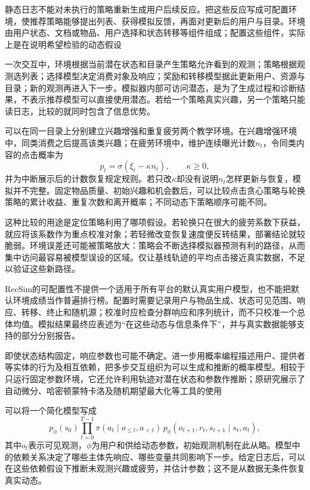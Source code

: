 静态日志不能对未执行的策略重新生成用户后续反应。把这些反应写成可配置环境，使推荐策略能够提出列表、获得模拟反馈，再面对更新后的用户与目录。环境由用户状态、文档或物品、用户选择和状态转移等组件组成；配置这些组件，实际上是在说明希望检验的动态假设

一次交互中，环境根据当前潜在状态和目录产生策略允许看到的观测；策略根据观测选列表；选择模型决定消费对象及响应；奖励和转移模型据此更新用户、资源与目录；新的观测再进入下一步。模拟器内部可访问潜态，是为了生成过程和诊断结果，不表示推荐模型可以直接使用潜态。若给一个策略真实兴趣，另一个策略只能读日志，比较的就同时包含了信息优势。

可以在同一目录上分别建立兴趣增强和重复疲劳两个教学环境。在兴趣增强环境中，同类消费之后提高该类兴趣；在疲劳环境中，维护连续曝光计数$n_t$，令同类内容的点击概率为
\[
 p_t=\sigma(\xi_t-\kappa n_t),
 \qquad \kappa\geq0,
\]
并为中断展示后的计数恢复规定规则。若只改$\kappa$却没有说明$n_t$怎样更新与恢复，模拟并不完整。固定物品质量、初始兴趣和机会数后，可以比较点击贪心策略与轮换策略的累计收益、重复次数和离开概率；不同动态下策略顺序可能不同。

这种比较的用途是定位策略利用了哪项假设。若轮换只在很大的疲劳系数下获益，就应将该系数作为重点校准对象；若轻微改变恢复速度便反转结果，部署结论就较脆弱。环境误差还可能被策略放大：策略会不断选择模拟器预测有利的路径，从而集中访问最容易被模型误设的区域。仅让基线轨迹的平均点击接近真实数据，不足以验证这些新路径。

RecSim的可配置性不提供一个适用于所有平台的默认真实用户模型，也不能把默认环境成绩当作普遍排行榜。配置时需要记录用户与物品生成、状态可见范围、响应、转移、终止和随机源；校准时应检查分群响应和序列统计，而不只校准一个总体均值。模拟结果最终应表述为“在这些动态与信息条件下”，并与真实数据能够支持的部分分别报告。

\Needspace{100mm}
即使状态结构固定，响应参数也可能不确定。进一步用概率编程描述用户、提供者等实体的行为及相互依赖，把多步交互组织为可以生成和推断的概率模型。相较于只运行固定参数环境，它还允许利用轨迹对潜在状态和参数作推断；原研究展示了自动微分、哈密顿蒙特卡洛及随机期望最大化等工具的使用

可以将一个简化模型写成
\[
 p_\phi(s_0)
 \prod_{t=0}^{T-1}
 \pi(a_t\mid o_{\leq t},a_{<t})\,
 p_\phi(o_{t+1},r_t,s_{t+1}\mid s_t,a_t),
\]
其中$o_t$表示可见观测，$\phi$为用户和供给动态参数，初始观测机制在此从略。模型中的依赖关系决定了哪些主体先响应、哪些变量共同影响下一步。给定日志后，可以在这些依赖假设下推断未观测兴趣或疲劳，并估计参数；这不是从数据无条件恢复真实动态。

